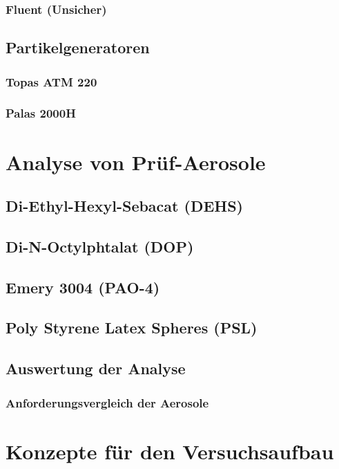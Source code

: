 \subsection{Fluent (Unsicher)}

\section{Partikelgeneratoren}
\subsection{Topas ATM 220}
\subsection{Palas 2000H}


\chapter{Analyse von Pr\"{u}f-Aerosole}\label{ch:aerosol}
\section{Di-Ethyl-Hexyl-Sebacat (DEHS)}
\section{Di-N-Octylphtalat (DOP)}
\section{Emery 3004 (PAO-4)}
\section{Poly Styrene Latex Spheres (PSL)}
\section{Auswertung der Analyse}
\subsection{Anforderungsvergleich der Aerosole}


\chapter{Konzepte f\"{u}r den Versuchsaufbau}\label{ch:concepts}
